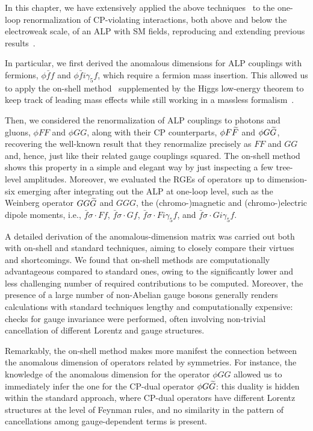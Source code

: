In this chapter, we have extensively applied the above techniques~\cite{Caron-Huot:2016cwu,Bresciani:2023jsu} to the one-loop renormalization of CP-violating interactions, both above and below the electroweak scale,  of an ALP with SM fields, reproducing and extending previous results~\cite{Marciano:2016yhf,DiLuzio:2020oah,Bauer:2020jbp,Chala:2020wvs,DasBakshi:2023lca,Galda:2021hbr,Galda:2023qjx}.

In particular, we  first derived the anomalous dimensions for ALP couplings with fermions, $\phi \bar f f$ and $\phi \bar f i \gamma_5 f$, which require a fermion mass insertion. This allowed us to apply the on-shell method~\cite{Caron-Huot:2016cwu} supplemented by the Higgs low-energy theorem to keep track of leading mass effects while still working in a massless formalism~\cite{Bresciani:2023jsu}. 

Then, we considered the renormalization of ALP couplings to photons and gluons, $\phi FF$ and $\phi GG$, along with their CP counterparts, $\phi F \widetilde{F}$ and $\phi G \widetilde{G}$, recovering the well-known result that they renormalize precisely as $FF$ and $GG$ and, hence, just like their related gauge couplings squared. 
The on-shell method shows this property in a simple and elegant way by just inspecting a few tree-level amplitudes.
Moreover, we evaluated the RGEs of operators up to dimension-six emerging after integrating out the ALP at one-loop level,  
such as the Weinberg operator $GG\widetilde{G}$ and $GGG$, the (chromo-)magnetic and (chromo-)electric dipole moments, 
i.e., $\bar f \sigma\!\cdot\! F f$, $\bar f \sigma\!\cdot\! G f$,
$\bar f \sigma\!\cdot\! F i\gamma_5 f$, and $\bar f \sigma\!\cdot\! G i\gamma_5 f$.

A detailed derivation of the anomalous-dimension matrix was carried out both with on-shell and standard techniques, 
aiming to closely compare their virtues and shortcomings.
%
We found that on-shell methods are computationally advantageous compared to standard ones, owing to the
significantly lower and less challenging number of required contributions to be computed.
Moreover, the presence of a large number of non-Abelian gauge bosons generally renders calculations with standard techniques lengthy and computationally expensive: checks for gauge invariance were performed, often involving non-trivial cancellation of different Lorentz and gauge structures.

Remarkably, the on-shell method makes more manifest the connection between the anomalous dimension of operators related by symmetries. 
For instance, the knowledge of the anomalous dimension for the operator $\phi GG$ allowed us to immediately 
infer the one for the CP-dual operator $\phi G\widetilde{G}$: this duality is hidden within the standard approach, where CP-dual operators have different Lorentz structures at the level of Feynman rules, and no similarity in the pattern of cancellations among gauge-dependent terms is present.

